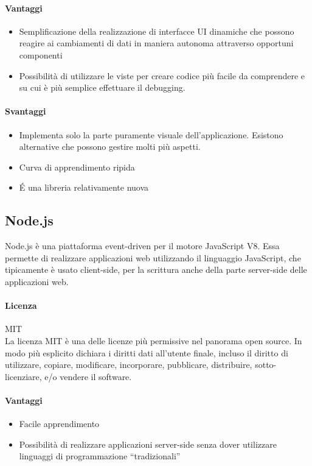 \paragraph{Vantaggi}
\begin{itemize}
	\item Semplificazione della realizzazione di interfacce UI dinamiche che possono reagire ai cambiamenti di dati in maniera autonoma attraverso opportuni componenti
	\item Possibilità di utilizzare le viste per creare codice più facile da comprendere e su cui è più semplice effettuare il debugging.
	
\end{itemize}

\paragraph{Svantaggi} 
\begin{itemize}
	\item Implementa solo la parte puramente visuale
     dell'applicazione. Esistono alternative che possono gestire molti
     più aspetti.
	\item Curva di apprendimento ripida
	\item \'E una libreria relativamente nuova
\end{itemize}

\subsection{Node.js}

Node.js è una piattaforma event-driven per il motore JavaScript
V8. Essa permette di realizzare applicazioni web utilizzando il
linguaggio JavaScript, che tipicamente è usato client-side, per la scrittura anche
della parte server-side delle applicazioni web. 
\\
\paragraph{Licenza} MIT \\
La licenza MIT è una delle licenze più permissive nel panorama open
source. In modo più esplicito dichiara i diritti dati all'utente
finale, incluso il diritto di utilizzare, copiare, modificare,
incorporare, pubblicare, distribuire, sotto-licenziare, e/o vendere il
software. \\

\paragraph{Vantaggi}
\begin{itemize}
	\item Facile apprendimento
	\item Possibilità di realizzare applicazioni server-side senza
     dover utilizzare linguaggi di programmazione “tradizionali”
\end{itemize}

